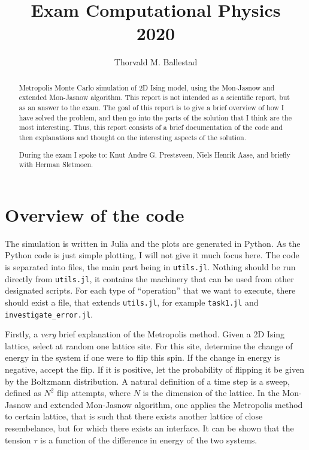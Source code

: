 \documentclass[12pt, a4paper]{article}
\title{Exam Computational Physics\\
  2020}
\author{Thorvald M. Ballestad}
\begin{document}
\maketitle
\begin{abstract}
  Metropolis Monte Carlo simulation of 2D Ising model, using the Mon-Jasnow and extended Mon-Jasnow algorithm.
  This report is not intended as a scientific report, but as an answer to the exam.
  The goal of this report is to give a brief overview of how I have solved the problem, and then go into the parts of the solution that I think are the most interesting.
  Thus, this report consists of a brief documentation of the code and then explanations and thought on the interesting aspects of the solution.


  During the exam I spoke to: Knut Andre G. Prestsveen, Niels Henrik Aase, and briefly with Herman Sletmoen.
\end{abstract}

\section{Overview of the code}
The simulation is written in Julia and the plots are generated in Python.
As the Python code is just simple plotting, I will not give it much focus here.
The code is separated into files, the main part being in \verb|utils.jl|.
Nothing should be run directly from \verb|utils.jl|, it contains the machinery that can be used from other designated scripts.
For each type of ``operation'' that we want to execute, there should exist a file, that extends \verb|utils.jl|, for example \verb|task1.jl| and \verb|investigate_error.jl|.

Firstly, a \emph{very} brief explanation of the Metropolis method.
Given a 2D Ising lattice, select at random one lattice site.
For this site, determine the change of energy in the system if one were to flip this spin.
If the change in energy is negative, accept the flip.
If it is positive, let the probability of flipping it be given by the Boltzmann distribution.
A natural definition of a time step is a sweep, defined as $N^2$ flip attempts, where $N$ is the dimension of the lattice.
In the Mon-Jasnow and extended Mon-Jasnow algorithm, one applies the Metropolis method to certain lattice, that is such that there exists another lattice of close resembelance, but for which there exists an interface.
It can be shown that the tension $\tau$ is a function of the difference in energy of the two systems.
\end{document}
